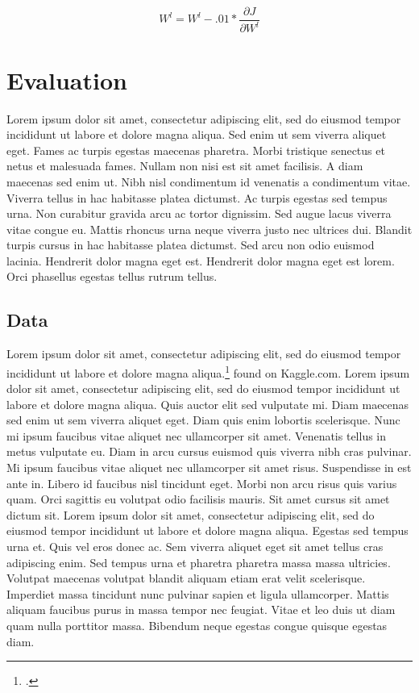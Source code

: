 \documentclass{cup-ino}
\begin{document}
\begin{equation} 
\label{grad_update_eqn}
W^l = W^l - .01*\frac{\partial J}{\partial W^l}
\end{equation}

\section{Evaluation}
Lorem ipsum dolor sit amet, consectetur adipiscing elit, sed do eiusmod tempor incididunt ut labore et dolore magna aliqua. Sed enim ut sem viverra aliquet eget. Fames ac turpis egestas maecenas pharetra. Morbi tristique senectus et netus et malesuada fames. Nullam non nisi est sit amet facilisis. A diam maecenas sed enim ut. Nibh nisl condimentum id venenatis a condimentum vitae. Viverra tellus in hac habitasse platea dictumst. Ac turpis egestas sed tempus urna. Non curabitur gravida arcu ac tortor dignissim. Sed augue lacus viverra vitae congue eu. Mattis rhoncus urna neque viverra justo nec ultrices dui. Blandit turpis cursus in hac habitasse platea dictumst. Sed arcu non odio euismod lacinia. Hendrerit dolor magna eget est. Hendrerit dolor magna eget est lorem. Orci phasellus egestas tellus rutrum tellus.
\subsection{Data}
Lorem ipsum dolor sit amet, consectetur adipiscing elit, sed do eiusmod tempor incididunt ut labore et dolore magna aliqua.\footcite{dataset} found on Kaggle.com. Lorem ipsum dolor sit amet, consectetur adipiscing elit, sed do eiusmod tempor incididunt ut labore et dolore magna aliqua. Quis auctor elit sed vulputate mi. Diam maecenas sed enim ut sem viverra aliquet eget. Diam quis enim lobortis scelerisque. Nunc mi ipsum faucibus vitae aliquet nec ullamcorper sit amet. Venenatis tellus in metus vulputate eu. Diam in arcu cursus euismod quis viverra nibh cras pulvinar. Mi ipsum faucibus vitae aliquet nec ullamcorper sit amet risus. Suspendisse in est ante in. Libero id faucibus nisl tincidunt eget. Morbi non arcu risus quis varius quam. Orci sagittis eu volutpat odio facilisis mauris. Sit amet cursus sit amet dictum sit. Lorem ipsum dolor sit amet, consectetur adipiscing elit, sed do eiusmod tempor incididunt ut labore et dolore magna aliqua. Egestas sed tempus urna et. Quis vel eros donec ac. Sem viverra aliquet eget sit amet tellus cras adipiscing enim. Sed tempus urna et pharetra pharetra massa massa ultricies. Volutpat maecenas volutpat blandit aliquam etiam erat velit scelerisque. Imperdiet massa tincidunt nunc pulvinar sapien et ligula ullamcorper. Mattis aliquam faucibus purus in massa tempor nec feugiat. Vitae et leo duis ut diam quam nulla porttitor massa. Bibendum neque egestas congue quisque egestas diam.
\end{document}
